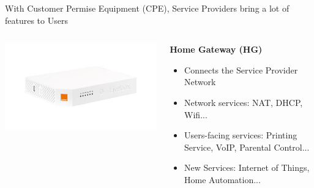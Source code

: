 \documentclass[a4paper]{beamer}
\begin{document}
\begin{frame}{With Customer Permise Equipment (CPE), Service Providers bring a lot of features to Users}
												
											
	\begin{columns}[T] 
		\begin{column}[T]{0.25 \textwidth} 
			\includegraphics[width=\linewidth]{livebox.png}
		\end{column}
																										
		\begin{column}[T]{0.75 \textwidth} %
																																							
			\textbf{Home Gateway  (HG)}
			\begin{itemize}
				\item Connects the Service Provider Network 
				\item Network services: NAT, DHCP, Wifi...
				\item Users-facing services: Printing Service, VoIP, Parental Control...
				\item New Services: Internet of Things, Home Automation...
			\end{itemize}
			\vspace{1em}
																																							
		\end{column}
																										
	\end{columns}
												
												
													

\end{frame}
\end{document}
